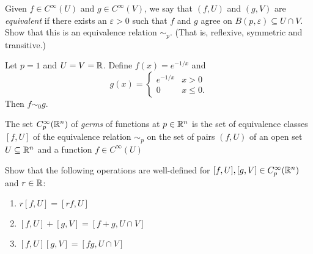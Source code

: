 \begin{frame}
  \begin{definition}
    Given $f \in C^{\infty}(U)$ and $g \in C^{\infty}(V)$, we say that $(f, U)$ and
    $(g, V)$ are {\em equivalent} if there exists an $\varepsilon > 0$ such that $f$
    and $g$ agree on $B(p, \varepsilon) \subseteq U \cap V$. Show that this is
    an equivalence relation $\sim_p$. (That is, reflexive, symmetric and transitive.)
  \end{definition}
  \begin{example}
    Let $p = 1$ and $U = V = \mathbb R$. Define $f(x) = e^{-1/x}$ and 
    \begin{displaymath}
      g(x) =
      \begin{cases}
        e^{-1/x} & x > 0 \\
        0 & x \le 0.
      \end{cases}
    \end{displaymath}
    Then $f \sim_0 g$.
  \end{example}
\end{frame}

\begin{frame}
  \begin{definition}[Germs]
    The set $C^{\infty}_p(\mathbb R^n)$ of {\em germs} of functions at $p \in \mathbb R^n$ is
    the set of equivalence classes $[f, U]$ of the equivalence relation $\sim_p$ on
    the set of pairs $(f, U)$ of an open set $U \subseteq \mathbb R^n$ and a function
    $f \in C^{\infty}(U)$
  \end{definition}
  \begin{exercise}
    Show that the following operations are well-defined for $[f, U], [g, V] \in 
    C^{\infty}_p(\mathbb R^n)$ and $r \in \mathbb R$:
    \begin{enumerate}
      \item $r[f, U] = [rf, U]$
      \item $[f, U] + [g, V] = [f + g, U \cap V]$
      \item $[f, U] [g, V] = [fg, U \cap V]$
    \end{enumerate}
  \end{exercise}
\end{frame}

